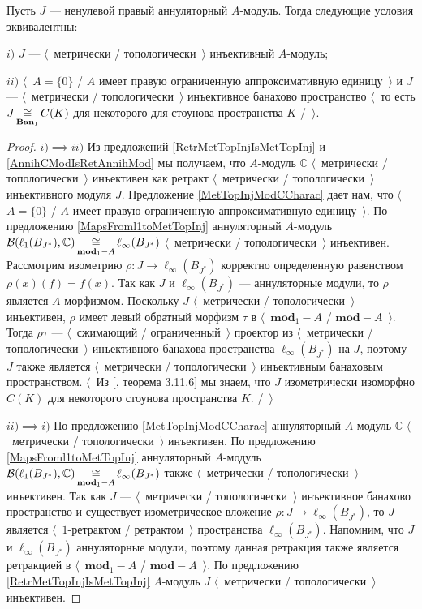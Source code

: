 \begin{proposition}\label{MetTopInjOfAnnihModCharac} Пусть $J$ --- ненулевой правый аннуляторный $A$-модуль. Тогда следующие условия эквивалентны:

$i)$ $J$ --- $\langle$~метрически / топологически~$\rangle$ инъективный $A$-модуль;

$ii)$ $\langle$~$A=\{0\}$ / $A$ имеет правую ограниченную аппроксимативную единицу~$\rangle$ и $J$ ---  $\langle$~метрически / топологически~$\rangle$ инъективное банахово пространство $\langle$~то есть $J\mathop{\mathbin{\cong}}\limits_{\mathbf{Ban}_1}C(K)$ для некоторого для стоунова пространства $K$ /~$\rangle$.
\end{proposition}
\begin{proof} $i)$$\implies$$ ii)$  Из предложений \ref{RetrMetTopInjIsMetTopInj} и \ref{AnnihCModIsRetAnnihMod} мы получаем, что $A$-модуль $\mathbb{C}$ $\langle$~метрически / топологически~$\rangle$ инъективен как ретракт $\langle$~метрически / топологически~$\rangle$ инъективного модуля $J$. Предложение \ref{MetTopInjModCCharac} дает нам, что $\langle$~$A=\{0\}$ / $A$ имеет правую ограниченную аппроксимативную единицу~$\rangle$. По предложению \ref{MapsFroml1toMetTopInj} аннуляторный $A$-модуль $\mathcal{B}(\ell_1(B_{J^*}),\mathbb{C})\mathop{\mathbin{\cong}}\limits_{\mathbf{mod}_1-A}\ell_\infty(B_{J^*})$ $\langle$~метрически / топологически~$\rangle$ инъективен. Рассмотрим изометрию $\rho:J\to\ell_\infty(B_{J^*})$ корректно определенную равенством $\rho(x)(f)=f(x)$. Так как $J$ и $\ell_\infty(B_{J^*})$ --- аннуляторные модули, то $\rho$ является $A$-морфизмом. Поскольку $J$ $\langle$~метрически / топологически~$\rangle$ инъективен, $\rho$ имеет левый обратный морфизм $\tau$ в $\langle$~$\mathbf{mod}_1-A$ / $\mathbf{mod}-A$~$\rangle$. Тогда $\rho\tau$ --- $\langle$~сжимающий / ограниченный~$\rangle$ проектор из $\langle$~метрически / топологически~$\rangle$ инъективного банахова пространства $\ell_\infty(B_{J^*})$ на $J$, поэтому $J$ также является $\langle$~метрически / топологически~$\rangle$ инъективным банаховым пространством. $\langle$~Из [\cite{LaceyIsomThOfClassicBanSp}, теорема 3.11.6] мы знаем, что $J$ изометрически изоморфно $C(K)$ для некоторого стоунова пространства $K$. /~$\rangle$ 

$ii)$$\implies$$ i)$ По предложению \ref{MetTopInjModCCharac} аннуляторный $A$-модуль $\mathbb{C}$ $\langle$~метрически / топологически~$\rangle$ инъективен. По предложению \ref{MapsFroml1toMetTopInj} аннуляторный $A$-модуль $\mathcal{B}(\ell_1(B_{J^*}),\mathbb{C})\mathop{\mathbin{\cong}}\limits_{\mathbf{mod}_1-A}\ell_\infty(B_{J^*})$ также $\langle$~метрически / топологически~$\rangle$ инъективен. Так как $J$ --- $\langle$~метрически / топологически~$\rangle$ инъективное банахово пространство и существует изометрическое вложение $\rho:J\to \ell_\infty(B_{J^*})$, то $J$ является $\langle$~$1$-ретрактом / ретрактом~$\rangle$ пространства $\ell_\infty(B_{J^*})$. Напомним, что $J$ и $\ell_\infty(B_{J^*})$ аннуляторные модули, поэтому данная ретракция также является ретракцией в $\langle$~$\mathbf{mod}_1-A$ / $\mathbf{mod}-A$~$\rangle$. По предложению \ref{RetrMetTopInjIsMetTopInj} $A$-модуль $J$ $\langle$~метрически / топологически~$\rangle$ инъективен.
\end{proof}

